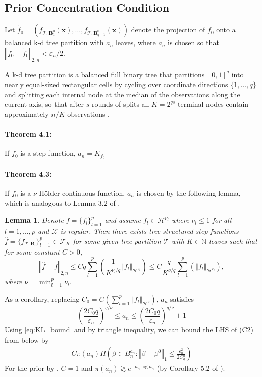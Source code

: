 \documentclass[12pt]{article}
\newcommand{\bm}[1]{\boldsymbol{#1}}
\newcommand{\mT}{\mathcal{T}}
\newcommand{\wt}[1]{\widetilde{#1}}
\newcommand{\norm}[1]{\left\Vert#1\right\Vert}
\newcommand{\1}{\mathbb{I}}
\def\mF{\mathcal{F}}
\def\B{\bm{B}}
\def\x{\bm{x}}
\def\x{\mbox{\boldmath$x$}}
\def\B{\mbox{\boldmath$B$}}
\def\B{\bm{B}}
\def\x{\bm{x}}
\theoremstyle{plain}
\newtheorem{lemma}[theorem]{Lemma}
\theoremstyle{definition}
\theoremstyle{remark}
\begin{document}
\subsection{Prior Concentration Condition} \label{sub:concentration_proof}
Let $\wt{f}_0=\left (f_{\mT,{\B_1^0}}(\x), \dots, f_{\mT,{\B_{q-1}^0}}(\x) \right )$ denote the projection of $f_0$ onto a balanced k-d tree partition with $a_n$ leaves, where $a_n$ is chosen so that $\norm{f_0-\wt{f}_0}_{2,n} < \varepsilon_n/2$. 

A k-d tree partition is a balanced full binary tree that partitions $[0,1]^q$ into nearly equal-sized rectangular cells by cycling over coordinate directions $\{1,\dots,q\}$ and splitting each internal node at the median of the observations along the current axis, so that after $s$ rounds of splits all $K=2^{qs}$ terminal nodes contain approximately $n/K$ observations \citep{rockova2019theory}.

\paragraph{Theorem 4.1:} If $f_0$ is a step function, $a_n=K_{f_0}$

\paragraph{Theorem 4.3:} If $f_0$ is a $\nu$-H\"{o}lder continuous function, $a_n$ is chosen by the following lemma, which is analogous to Lemma 3.2 of \cite{rockova2020posterior}.

\begin{lemma}
Denote $f=\{f_l\}_{l=1}^{p}$ and assume $f_l \in \mathcal{H}^{\nu_l}$ where $\nu_l \le 1$ for all $l=1,\dots,p$ and $\mathcal{X}$ is regular. Then there exists tree structured step functions $\hat{f}=\{f_{\mT,\B_l}\}_{l=1}^{p} \in \mF_K$ for some given tree partition $\mT$ with $K \in \mathbb{N}$ leaves such that for some constant $C > 0$,
$$
\norm{\hat{f}-f}_{2,n} \le C q \sum_{l=1}^{p} \left ( \frac{1}{K^{\nu_l/q}}  \norm{f_l}_{\mathcal{H}^{\nu_l}}\right) \le C \frac{q}{K^{\nu/q}}  \sum_{l=1}^{p} \left ( \norm{f_l}_{\mathcal{H}^{\nu_l}}\right),
$$
where $\nu=\min_{l=1}^{p}\nu_l$.
\end{lemma}
As a corollary, replacing $C_0=C \left (\sum_{l=1}^{p} \norm{f_l}_{\mathcal{H}^\nu}\right)$, $a_n$ satisfies
\begin{equation}\label{eq:a_n_bound}
\left (\frac{2C_0 q}{\varepsilon_n} \right)^{q/\nu} \le a_n \le \left (\frac{2C_0 q}{\varepsilon_n} \right)^{q/\nu} + 1
\end{equation}
Using \eqref{eq:KL_bound} and by triangle inequality, we can bound the LHS of (C2) from below by
\begin{align*}
    C \pi(a_n) \Pi \left (\beta \in B_n^{a_n} : \norm{\beta-\beta^0}_1 \le \frac{\epsilon_n^2}{2C_g^n} \right)
\end{align*}
For the prior by \cite{chipman2010bart}, $C=1$ and $\pi(a_n) \gtrsim e^{-a_n \log a_n}$ (by Corollary 5.2 of \cite{rockova2019theory}).
\end{document}
